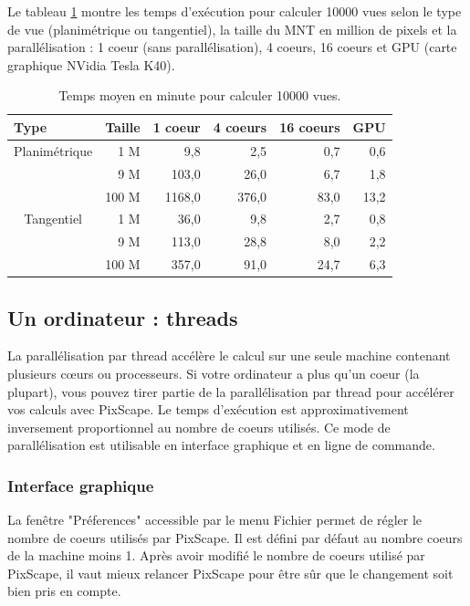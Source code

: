 \documentclass{report}
\begin{document}
Le tableau \ref{perf_table} montre les temps d'exécution pour calculer 10000 vues selon le type de vue (planimétrique ou tangentiel), la taille du MNT en million de pixels et la parallélisation : 1 coeur (sans parallélisation), 4 coeurs, 16 coeurs et GPU (carte graphique NVidia Tesla K40).

\begin{table}[htbp]
	
	\begin{tabular}{|l|r|r|r|r|r|}
		\hline
		Type & \multicolumn{1}{l|}{Taille} & \multicolumn{1}{l|}{1 coeur} & \multicolumn{1}{l|}{4 coeurs} & \multicolumn{1}{l|}{16 coeurs} & \multicolumn{1}{l|}{GPU} \\ \hline
		\multicolumn{ 1}{|c|}{Planimétrique} & 1 M & 9,8 & 2,5 & 0,7 & 0,6 \\ \cline{ 2- 6}
		\multicolumn{ 1}{|l|}{} & 9 M & 103,0 & 26,0 & 6,7 & 1,8 \\ \cline{ 2- 6}
		\multicolumn{ 1}{|l|}{} & 100 M & 1168,0 & 376,0 & 83,0 & 13,2 \\ \hline
		\multicolumn{ 1}{|c|}{Tangentiel} & 1 M & 36,0 & 9,8 & 2,7 & 0,8 \\ \cline{ 2- 6}
		\multicolumn{ 1}{|l|}{} & 9 M & 113,0 & 28,8 & 8,0 & 2,2 \\ \cline{ 2- 6}
		\multicolumn{ 1}{|l|}{} & 100 M & 357,0 & 91,0 & 24,7 & 6,3 \\ \hline
	\end{tabular}
	\caption{Temps moyen en minute pour calculer 10000 vues.}
	\label{perf_table}
\end{table}



\subsection{Un ordinateur : threads}
\label{thread}
La parallélisation par thread accélère le calcul sur une seule machine contenant plusieurs cœurs ou processeurs.
Si votre ordinateur a plus qu'un coeur (la plupart), vous pouvez tirer partie de la parallélisation par thread pour accélérer vos calculs avec PixScape. Le temps d'exécution est approximativement inversement proportionnel au nombre de coeurs utilisés. Ce mode de parallélisation est utilisable en interface graphique et en ligne de commande.

\subsubsection{Interface graphique}
La fenêtre "Préferences" accessible par le menu Fichier permet de régler le nombre de coeurs utilisés par PixScape. Il est défini par défaut au nombre coeurs de la machine moins 1. Après avoir modifié le nombre de coeurs utilisé par PixScape, il vaut mieux relancer PixScape pour être sûr que le changement soit bien pris en compte.
\end{document}
